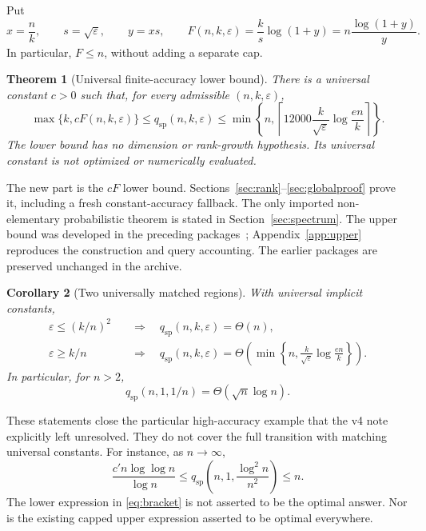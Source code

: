 \documentclass[11pt]{article}
\numberwithin{equation}{section}
\newtheorem{theorem}{Theorem}[section]
\newtheorem{corollary}[theorem]{Corollary}
\theoremstyle{remark}\newtheorem{remark}[theorem]{Remark}
\newcommand{\eps}{\varepsilon}
\newcommand{\qsp}{q_{\mathrm{sp}}}
\begin{document}
Put
\begin{equation}\label{eq:F}
x=\frac nk,\qquad s=\sqrt\eps,\qquad y=xs,\qquad
F(n,k,\eps)=\frac{k}{s}\log(1+y)
=n\frac{\log(1+y)}{y}.
\end{equation}
In particular, $F\le n$, without adding a separate cap.

\begin{theorem}[Universal finite-accuracy lower bound]\label{thm:global}
There is a universal constant $c>0$ such that, for every admissible $(n,k,\eps)$,
\begin{equation}\label{eq:bracket}
\max\{k,cF(n,k,\eps)\}
\le\qsp(n,k,\eps)
\le\min\!\left\{n,\left\lceil12000\frac{k}{\sqrt\eps}\log\frac{en}{k}\right\rceil\right\}.
\end{equation}
The lower bound has no dimension or rank-growth hypothesis. Its universal constant is not optimized or numerically evaluated.
\end{theorem}
The new part is the $cF$ lower bound. Sections~\ref{sec:rank}--\ref{sec:globalproof} prove it, including a fresh constant-accuracy fallback. The only imported non-elementary probabilistic theorem is stated in Section~\ref{sec:spectrum}. The upper bound was developed in the preceding packages~\cite{prior3,prior4}; Appendix~\ref{app:upper} reproduces the construction and query accounting. The earlier packages are preserved unchanged in the archive.

\begin{corollary}[Two universally matched regions]\label{cor:regions}
With universal implicit constants,
\begin{align}
\eps\le(k/n)^2&\quad\Longrightarrow\quad \qsp(n,k,\eps)=\Theta(n),\label{eq:tiny}\\
\eps\ge k/n&\quad\Longrightarrow\quad
\qsp(n,k,\eps)=\Theta\!\left(\min\left\{n,\frac{k}{\sqrt\eps}\log\frac{en}{k}\right\}\right).
\label{eq:moderate}
\end{align}
In particular, for $n>2$,
\begin{equation}\label{eq:closedexample}
\qsp(n,1,1/n)=\Theta(\sqrt n\log n).
\end{equation}
\end{corollary}
These statements close the particular high-accuracy example that the v4 note explicitly left unresolved. They do not cover the full transition with matching universal constants. For instance, as $n\to\infty$,
\begin{equation}\label{eq:remainingexample}
\frac{c' n\log\log n}{\log n}
\le\qsp\!\left(n,1,\frac{\log^2 n}{n^2}\right)\le n.
\end{equation}
The lower expression in \eqref{eq:bracket} is not asserted to be the optimal answer. Nor is the existing capped upper expression asserted to be optimal everywhere.
\end{document}

